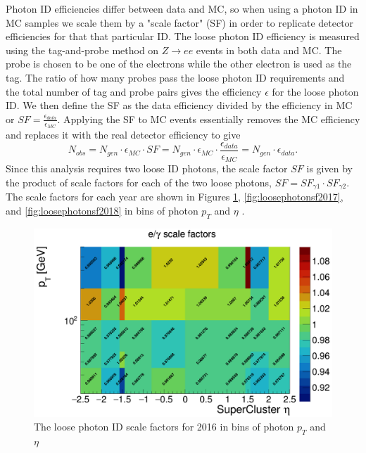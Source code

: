 Photon ID efficiencies differ between data and MC, so when using a photon ID in MC samples we scale them by a "scale factor" (SF) in order to replicate detector efficiencies for that that particular ID.  The loose photon ID efficiency is measured using the tag-and-probe method on $Z\rightarrow ee$ events in both data and MC.  The probe is chosen to be one of the electrons while the other electron is used as the tag.  The ratio of how many probes pass the loose photon ID requirements and the total number of tag and probe pairs gives the efficiency $\epsilon$ for the loose photon ID.  We then define the SF as the data efficiency divided by the efficiency in MC or $SF = \frac{\epsilon_{data}}{\epsilon_{MC}}$.  Applying the SF to MC events essentially removes the MC efficiency and replaces it with the real detector efficiency to give
\begin{equation}
	N_{obs} = N_{gen}\cdot \epsilon_{MC}\cdot SF =  N_{gen}\cdot \epsilon_{MC}\cdot \frac{\epsilon_{data}}{\epsilon_{MC}} = N_{gen}\cdot \epsilon_{data}.
\end{equation}
Since this analysis requires two loose ID photons, the scale factor $SF$ is given by the product of scale factors for each of the two loose photons, $SF = SF_{\gamma1}\cdot SF_{\gamma2}$.  The scale factors for each year are shown in Figures \ref{fig:loosephotonsf2016}, \ref{fig:loosephotonsf2017}, and \ref{fig:loosephotonsf2018} in bins of photon $p_T$ and $\eta$ \cite{PhotonSF}.
\begin{figure}[h]
	\centering
	\includegraphics[width=1.0\linewidth]{Figures/LoosePhotonSF_2016}
	\caption[Scale factors for 2016 loose photon ID.]{The loose photon ID scale factors for 2016 in bins of photon $p_T$ and $\eta$}
	\label{fig:loosephotonsf2016}
\end{figure}
